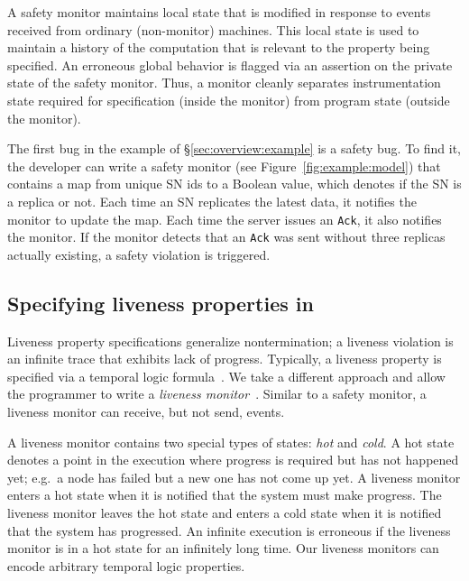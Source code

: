 A safety monitor maintains local state that is modified in response to events received from ordinary (non-monitor) machines. This local state is used to maintain a history of the computation that is relevant to the property being specified. An erroneous global behavior is flagged via an assertion on the private state of the safety monitor. Thus, a monitor cleanly separates instrumentation state required for specification (inside the monitor) from program state (outside the monitor).

The first bug in the example of \S\ref{sec:overview:example} is a safety bug. To find it, the developer can write a safety monitor (see Figure~\ref{fig:example:model}) that contains a map from unique SN ids to a Boolean value, which denotes if the SN is a replica or not. Each time an SN replicates the latest data, it notifies the monitor to update the map. Each time the server issues an \texttt{Ack}, it also notifies the monitor. If the monitor detects that an \texttt{Ack} was sent without three replicas actually existing, a safety violation is triggered.

\vspace{-1mm}
\subsection{Specifying liveness properties in \psharp}
\label{sec:overview:liveness}

Liveness property specifications generalize nontermination; a liveness violation is an infinite trace that exhibits lack of progress. Typically, a liveness property is specified via a temporal logic formula~\cite{Pnueli1977, lamport1994temporal}. We take a different approach and allow the programmer to write a \emph{liveness monitor}~\cite{desai2015building}. Similar to a safety monitor, a liveness monitor can receive, but not send, events.

A liveness monitor contains two special types of states: \emph{hot} and \emph{cold}. A hot state denotes a point in the execution where progress is required but has not happened yet; e.g.\ a node has failed but a new one has not come up yet. A liveness monitor enters a hot state when it is notified that the system must make progress. The liveness monitor leaves the hot state and enters a cold state when it is notified that the system has progressed. An infinite execution is erroneous if the liveness monitor is in a hot state for an infinitely long time. Our liveness monitors can encode arbitrary temporal logic properties.

